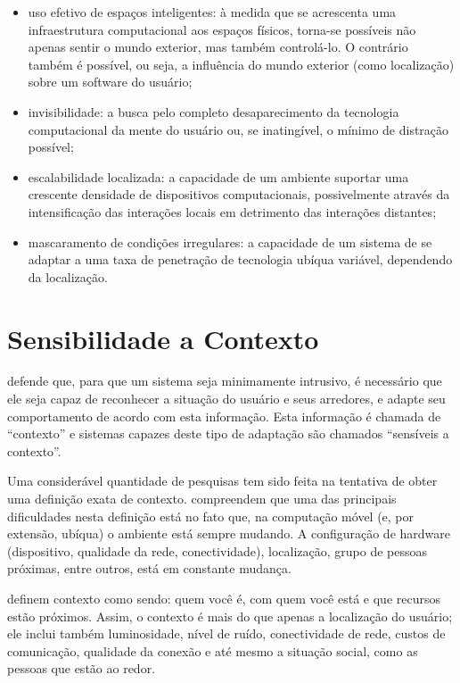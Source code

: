 \begin{itemize}
  \item uso efetivo de espaços inteligentes: à medida que se acrescenta uma infraestrutura computacional aos espaços físicos, torna-se possíveis não apenas sentir o mundo exterior, mas também controlá-lo. O contrário também é possível, ou seja, a influência do mundo exterior (como localização) sobre um software do usuário;

  \item invisibilidade: a busca pelo completo desaparecimento da tecnologia computacional da mente do usuário ou, se inatingível, o mínimo de distração possível;

  \item escalabilidade localizada: a capacidade de um ambiente suportar uma crescente densidade de dispositivos computacionais, possivelmente através da intensificação das interações locais em detrimento das interações distantes;

  \item mascaramento de condições irregulares: a capacidade de um sistema de se adaptar a uma taxa de penetração de tecnologia ubíqua variável, dependendo da localização.
\end{itemize}


\section{Sensibilidade a Contexto}
\label{sec:contexto}

 defende que, para que um sistema seja minimamente intrusivo, é necessário que ele seja capaz de reconhecer a situação do usuário e seus arredores, e adapte seu comportamento de acordo com esta informação. Esta informação é chamada de ``contexto'' e sistemas capazes deste tipo de adaptação são chamados ``sensíveis a contexto''.

Uma considerável quantidade de pesquisas tem sido feita na tentativa de obter uma definição exata de contexto.  compreendem que uma das principais dificuldades nesta definição está no fato que, na computação móvel (e, por extensão, ubíqua) o ambiente está sempre mudando. A configuração de hardware (dispositivo, qualidade da rede, conectividade), localização, grupo de pessoas próximas, entre outros, está em constante mudança.

 definem contexto como sendo: quem você é, com quem você está e que recursos estão próximos. Assim, o contexto é mais do que apenas a localização do usuário; ele inclui também luminosidade, nível de ruído, conectividade de rede, custos de comunicação, qualidade da conexão e até mesmo a situação social, como as pessoas que estão ao redor.

